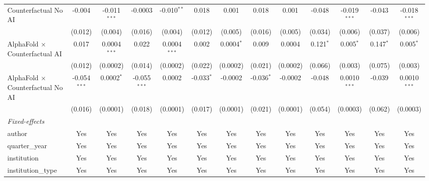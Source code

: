 \begin{tabular}{lcccccccccccc}
   Counterfactual No AI                     & -0.004         & -0.011$^{***}$ & -0.0003        & -0.010$^{**}$  & 0.018        & 0.001        & 0.018        & 0.001    & -0.048        & -0.019$^{***}$ & -0.043        & -0.018$^{***}$\\   
                                            & (0.012)        & (0.004)        & (0.016)        & (0.004)        & (0.012)      & (0.005)      & (0.016)      & (0.005)  & (0.034)       & (0.006)        & (0.037)       & (0.006)\\   
   AlphaFold $\times$ Counterfactual AI     & 0.017          & 0.0004$^{***}$ & 0.022          & 0.0004$^{***}$ & 0.002        & 0.0004$^{*}$ & 0.009        & 0.0004   & 0.121$^{*}$   & 0.005$^{*}$    & 0.147$^{*}$   & 0.005$^{*}$\\   
                                            & (0.012)        & (0.0002)       & (0.014)        & (0.0002)       & (0.022)      & (0.0002)     & (0.021)      & (0.0002) & (0.066)       & (0.003)        & (0.075)       & (0.003)\\   
   AlphaFold $\times$ Counterfactual No AI  & -0.054$^{***}$ & 0.0002$^{*}$   & -0.055$^{***}$ & 0.0002         & -0.033$^{*}$ & -0.0002      & -0.036$^{*}$ & -0.0002  & -0.048        & 0.0010$^{***}$ & -0.039        & 0.0010$^{***}$\\   
                                            & (0.016)        & (0.0001)       & (0.018)        & (0.0001)       & (0.017)      & (0.0001)     & (0.021)      & (0.0001) & (0.054)       & (0.0003)       & (0.062)       & (0.0003)\\   
   \midrule
   \emph{Fixed-effects}\\
   author                                   & Yes            & Yes            & Yes            & Yes            & Yes          & Yes          & Yes          & Yes      & Yes           & Yes            & Yes           & Yes\\  
   quarter\_year                            & Yes            & Yes            & Yes            & Yes            & Yes          & Yes          & Yes          & Yes      & Yes           & Yes            & Yes           & Yes\\  
   institution                              & Yes            & Yes            & Yes            & Yes            & Yes          & Yes          & Yes          & Yes      & Yes           & Yes            & Yes           & Yes\\  
   institution\_type                        & Yes            & Yes            & Yes            & Yes            & Yes          & Yes          & Yes          & Yes      & Yes           & Yes            & Yes           & Yes\\  

\end{tabular}
